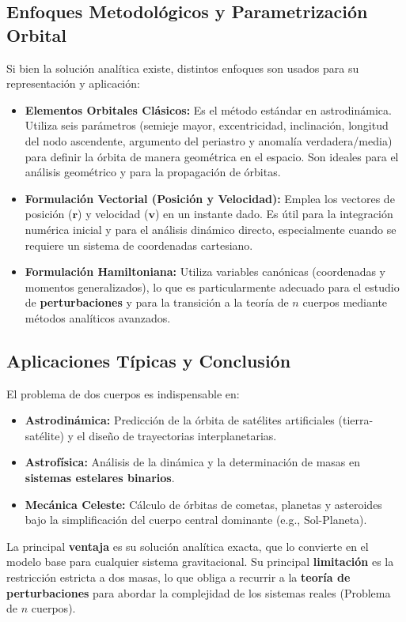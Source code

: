 \subsection{Enfoques Metodológicos y Parametrización Orbital}
\label{subsec:enfoques_metodologicos_dos_cuerpos}

Si bien la solución analítica existe, distintos enfoques son usados para su representación y aplicación:
\begin{itemize}
    \item \textbf{Elementos Orbitales Clásicos:} Es el método estándar en astrodinámica. Utiliza seis parámetros (semieje mayor, excentricidad, inclinación, longitud del nodo ascendente, argumento del periastro y anomalía verdadera/media) para definir la órbita de manera geométrica en el espacio. Son ideales para el análisis geométrico y para la propagación de órbitas.
    \item \textbf{Formulación Vectorial (Posición y Velocidad):} Emplea los vectores de posición ($\mathbf{r}$) y velocidad ($\mathbf{v}$) en un instante dado. Es útil para la integración numérica inicial y para el análisis dinámico directo, especialmente cuando se requiere un sistema de coordenadas cartesiano.
    \item \textbf{Formulación Hamiltoniana:} Utiliza variables canónicas (coordenadas y momentos generalizados), lo que es particularmente adecuado para el estudio de \textbf{perturbaciones} y para la transición a la teoría de $n$ cuerpos mediante métodos analíticos avanzados.
\end{itemize}

\subsection{Aplicaciones Típicas y Conclusión}

El problema de dos cuerpos es indispensable en:
\begin{itemize}
    \item \textbf{Astrodinámica:} Predicción de la órbita de satélites artificiales (tierra-satélite) y el diseño de trayectorias interplanetarias.
    \item \textbf{Astrofísica:} Análisis de la dinámica y la determinación de masas en \textbf{sistemas estelares binarios}.
    \item \textbf{Mecánica Celeste:} Cálculo de órbitas de cometas, planetas y asteroides bajo la simplificación del cuerpo central dominante (e.g., Sol-Planeta).
\end{itemize}

La principal \textbf{ventaja} es su solución analítica exacta, que lo convierte en el modelo base para cualquier sistema gravitacional. Su principal \textbf{limitación} es la restricción estricta a dos masas, lo que obliga a recurrir a la \textbf{teoría de perturbaciones} para abordar la complejidad de los sistemas reales (Problema de $n$ cuerpos).